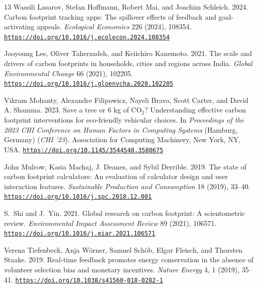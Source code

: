 \documentclass[12pt,a4paper,twocolumn]{article}
\newcommand{\doi}[1]{\href{https://doi.org/#1}{\nolinkurl{https://doi.org/#1}}}
\begin{document}
\begin{thebibliography}{13}
Wassili Lasarov, Stefan Hoffmann, Robert Mai, and Joachim Schleich. 2024. Carbon footprint tracking apps: The spillover effects of feedback and goal-activating appeals. \emph{Ecological Economics} 226 (2024), 108354. \doi{10.1016/j.ecolecon.2024.108354}

Jooyoung Lee, Oliver Taherzadeh, and Keiichiro Kanemoto. 2021. The scale and drivers of carbon footprints in households, cities and regions across India. \emph{Global Environmental Change} 66 (2021), 102205. \doi{10.1016/j.gloenvcha.2020.102205}

Vikram Mohanty, Alexandre Filipowicz, Nayeli Bravo, Scott Carter, and David A. Shamma. 2023. Save a tree or 6 kg of CO$_2$? Understanding effective carbon footprint interventions for eco-friendly vehicular choices. In \emph{Proceedings of the 2023 CHI Conference on Human Factors in Computing Systems} (Hamburg, Germany) (\emph{CHI '23}). Association for Computing Machinery, New York, NY, USA. \doi{10.1145/3544548.3580675}

John Mulrow, Kasia Machaj, J. Deanes, and Sybil Derrible. 2019. The state of carbon footprint calculators: An evaluation of calculator design and user interaction features. \emph{Sustainable Production and Consumption} 18 (2019), 33--40. \doi{10.1016/j.spc.2018.12.001}

S.~Shi and J.~Yin. 2021. Global research on carbon footprint: A scientometric review. \emph{Environmental Impact Assessment Review} 89 (2021), 106571. \doi{10.1016/j.eiar.2021.106571}

Verena Tiefenbeck, Anja W\"orner, Samuel Sch\"ob, Elgar Fleisch, and Thorsten Staake. 2019. Real-time feedback promotes energy conservation in the absence of volunteer selection bias and monetary incentives. \emph{Nature Energy} 4, 1 (2019), 35--41. \doi{10.1038/s41560-018-0282-1}

\end{thebibliography}
\end{document}
